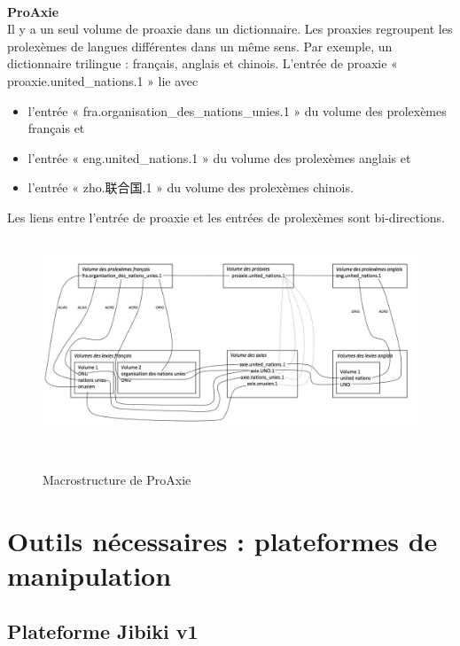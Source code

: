 \documentclass[10pt,a4paper,twoside]{article}
\begin{document}
\quad  \\
\textbf{ProAxie}\\
Il y a un seul volume de proaxie dans un dictionnaire. Les proaxies regroupent les prolexèmes de langues différentes dans un même sens. Par exemple, un dictionnaire trilingue : français, anglais et chinois. L’entrée de proaxie « proaxie.united\_nations.1 » lie avec 
\begin{itemize}
\begin{itemize}
\item l’entrée « fra.organisation\_des\_nations\_unies.1 » du volume des prolexèmes français et 
\item l’entrée « eng.united\_nations.1 » du volume des prolexèmes anglais et
\item l’entrée « zho.联合国.1 » du volume des prolexèmes chinois.
\end{itemize}
\end{itemize}
Les liens entre l'entrée de proaxie et les entrées de prolexèmes sont bi-directions.\\
\\

\begin{figure}[htbp] 
\begin{center} 
\includegraphics[width=14cm]{images/proaxie.jpg}
\end{center} 
\caption{Macrostructure de ProAxie} \label{image} \
\end{figure}


\section{Outils nécessaires : plateformes de manipulation}

\subsection{Plateforme Jibiki v1}
\end{document}
